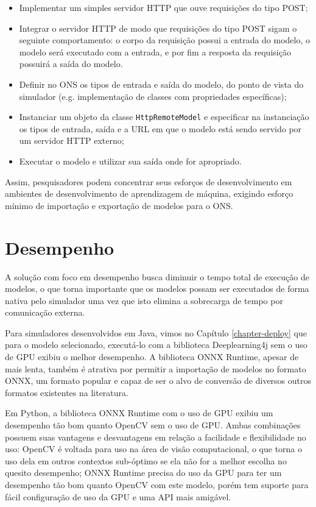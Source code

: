 \begin{itemize}
  \item Implementar um simples servidor HTTP que ouve requisições do tipo POST;
  \item Integrar o servidor HTTP de modo que requisições do tipo POST sigam o seguinte comportamento: o corpo da requisição possui a entrada do modelo, o modelo será executado com a entrada, e por fim a resposta da requisição possuirá a saída do modelo.
  \item Definir no ONS os tipos de entrada e saída do modelo, do ponto de vista do simulador (e.g. implementação de classes com propriedades específicas);
  \item Instanciar um objeto da classe \texttt{HttpRemoteModel} e especificar na instanciação os tipos de entrada, saída e a URL em que o modelo está sendo servido por um servidor HTTP externo;
  \item Executar o modelo e utilizar sua saída onde for apropriado.
\end{itemize}

Assim, pesquisadores podem concentrar seus esforços de desenvolvimento em ambientes de desenvolvimento de aprendizagem de máquina, exigindo esforço mínimo de importação e exportação de modelos para o ONS.

\section{Desempenho}

A solução com foco em desempenho busca diminuir o tempo total de execução de modelos, o que torna importante que os modelos possam ser executados de forma nativa pelo simulador uma vez que isto elimina a sobrecarga de tempo por comunicação externa.

Para simuladores desenvolvidos em Java, vimos no Capítulo \ref{chapter-deploy} que para o modelo selecionado, executá-lo com a biblioteca Deeplearning4j sem o uso de GPU exibiu o melhor desempenho. A biblioteca ONNX Runtime, apesar de mais lenta, também é atrativa por permitir a importação de modelos no formato ONNX, um formato popular e capaz de ser o alvo de conversão de diversos outros formatos existentes na literatura.

Em Python, a biblioteca ONNX Runtime com o uso de GPU exibiu um desempenho tão bom quanto OpenCV sem o uso de GPU. Ambas combinações possuem suas vantagens e desvantagens em relação a facilidade e flexibilidade no uso: OpenCV é voltada para uso na área de visão computacional, o que torna o uso dela em outros contextos sub-óptimo se ela não for a melhor escolha no quesito desempenho; ONNX Runtime precisa do uso da GPU para ter um desempenho tão bom quanto OpenCV com este modelo, porém tem suporte para fácil configuração de uso da GPU e uma API mais amigável.

